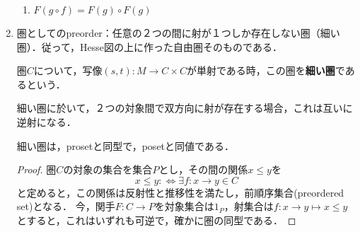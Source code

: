 \documentclass[uplatex, dvipdfmx]{jsarticle}
\begin{document}
\begin{enumerate}
\begin{definition}[Functor]
\begin{enumerate}[(1)]
            \item $F(g\circ f)=F(g)\circ F(g)$
        \end{enumerate}
    \end{definition}
    \item 圏としてのpreorder：任意の２つの間に射が１つしか存在しない圏（細い圏）．従って，Hesse図の上に作った自由圏そのものである．
    \begin{definition*}
        圏$C$について，写像$(s,t):M\to C\times C$が単射である時，この圏を\textbf{細い圏}であるという．
    \end{definition*}
    \begin{corollary*}
        細い圏に於いて，２つの対象間で双方向に射が存在する場合，これは互いに逆射になる．
    \end{corollary*}
    \begin{proposition*}
        細い圏は，prosetと同型で，posetと同値である．
    \end{proposition*}
    \begin{proof}
        圏$C$の対象の集合を集合$P$とし，その間の関係$x\le y$を
        \[ x\le y:\Leftrightarrow \exists f:x\to y\in C \]
        と定めると，この関係は反射性と推移性を満たし，前順序集合(preordered set)となる．
        今，関手$F:C\to P$を対象集合は$1_P$，射集合は$f:x\to y\mapsto x\le y$とすると，これはいずれも可逆で，確かに圏の同型である．
    

\end{proof}
\end{enumerate}
\end{document}

